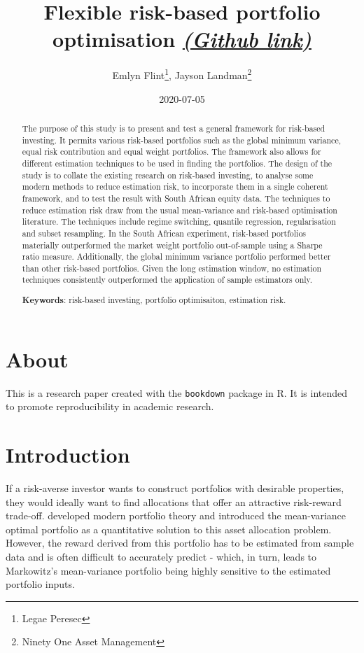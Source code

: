 \documentclass[
]{article}
\title{Flexible risk-based portfolio optimisation
\href{https://github.com/jhlandman/flex_rb_opt}{\emph{(Github link)}}}
\author{Emlyn Flint\footnote{Legae Peresec}, Jayson Landman\footnote{Ninety One Asset Management}}
\date{2020-07-05}
\begin{document}
\maketitle
\begin{abstract}
The purpose of this study is to present and test a general framework for risk-based investing. It permits various risk-based portfolios such as the global minimum variance, equal risk contribution and equal weight portfolios. The framework also allows for different estimation techniques to be used in finding the portfolios. The design of the study is to collate the existing research on risk-based investing, to analyse some modern methods to reduce estimation risk, to incorporate them in a single coherent framework, and to test the result with South African equity data. The techniques to reduce estimation risk draw from the usual mean-variance and risk-based optimisation literature. The techniques include regime switching, quantile regression, regularisation and subset resampling. In the South African experiment, risk-based portfolios materially outperformed the market weight portfolio out-of-sample using a Sharpe ratio measure. Additionally, the global minimum variance portfolio performed better than other risk-based portfolios. Given the long estimation window, no estimation techniques consistently outperformed the application of sample estimators only.

\textbf{Keywords}: risk-based investing, portfolio optimisaiton, estimation risk.
\end{abstract}

{
\setcounter{tocdepth}{2}
\tableofcontents
}
\hypertarget{about}{%
\section{About}\label{about}}

This is a research paper created with the \texttt{bookdown} package in R. It is intended to promote
reproducibility in academic research.

\hypertarget{introduction}{%
\section{Introduction}\label{introduction}}

If a risk-averse investor wants to construct portfolios with desirable properties, they would
ideally want to find allocations that offer an attractive risk-reward trade-off. \citet{M52} developed
modern portfolio theory and introduced the mean-variance optimal portfolio as a quantitative
solution to this asset allocation problem. However, the reward derived from this portfolio has to be
estimated from sample data and is often difficult to accurately predict - which, in turn, leads to
Markowitz's mean-variance portfolio being highly sensitive to the estimated portfolio inputs.
\end{document}
